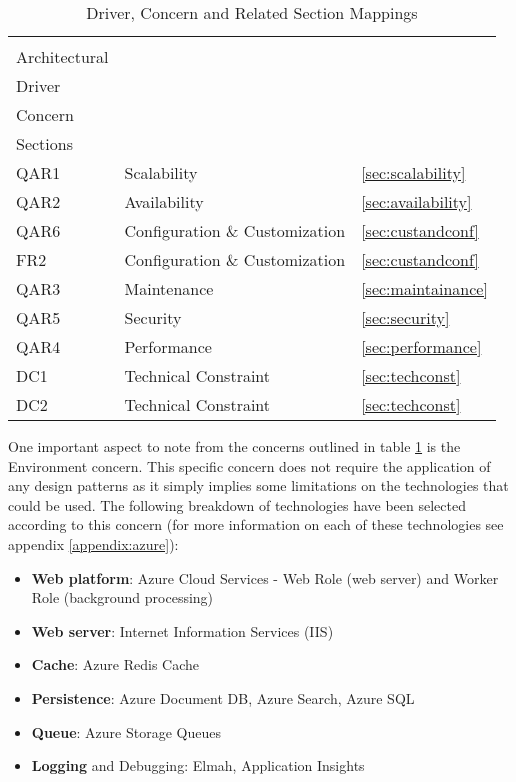 \begin{table}[h]
\centering
\begin{tabularx}{\linewidth}{lXl}
\rowcolor[HTML]{EFEFEF} 
\begin{tabular}[c]{@{}l@{}}Candidat\\ Architectural\\ Driver\end{tabular} & \begin{tabular}[c]{@{}l@{}}Design\\ Concern\end{tabular} & \begin{tabular}[c]{@{}l@{}}Related\\ Sections\end{tabular} \\
QAR1 & Scalability & \ref{sec:scalability} \\
QAR2 & Availability & \ref{sec:availability} \\
QAR6 & Configuration \& Customization & \ref{sec:custandconf} \\
FR2 & Configuration \& Customization & \ref{sec:custandconf} \\
QAR3 & Maintenance & \ref{sec:maintainance} \\
QAR5 & Security & \ref{sec:security} \\
QAR4 & Performance & \ref{sec:performance} \\
DC1 & Technical Constraint & \ref{sec:techconst} \\
DC2 & Technical Constraint & \ref{sec:techconst} \\
\end{tabularx}
\caption{Driver, Concern and Related Section Mappings}
\label{table:designconcerns}
\end{table}

One important aspect to note from the concerns outlined in table \ref{table:designconcerns} is the Environment concern. This specific concern does not require the application of any design patterns as it simply implies some limitations on the technologies that could be used. The following breakdown of technologies have been selected according to this concern (for more information on each of these technologies see appendix \ref{appendix:azure}):
\begin{itemize}
\item \textbf{Web platform}: Azure Cloud Services - Web Role (web server) and Worker Role (background processing)
\item \textbf{Web server}: Internet Information Services (IIS)
\item \textbf{Cache}: Azure Redis Cache
\item \textbf{Persistence}: Azure Document DB, Azure Search, Azure SQL 
\item \textbf{Queue}: Azure Storage Queues
\item \textbf{Logging} and Debugging: Elmah, Application Insights
\end{itemize}

